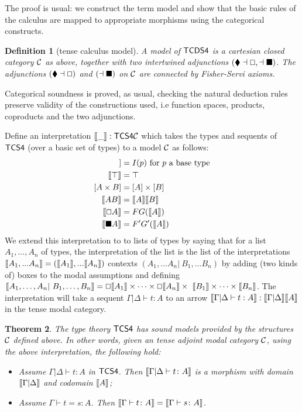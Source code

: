 \documentclass{article}
\let\Diamond\relax
\newcommand{\bLozenge}{\mathbin{\blacklozenge}}
\let\to\relax
\newcommand{\to}{\rightarrow}
\renewcommand{\Box}{\oblong}
\def\sem#1{[\hspace{-0.05cm}[#1]\hspace{-0.05cm}]}
\newtheorem{theorem}{Theorem}
\newtheorem{definition}[theorem]{Definition}
\begin{document}
The proof is usual: we construct the term model and show that the basic rules of the calculus are mapped to 
appropriate morphisms using  the categorical constructs. 
\fi 

\begin{definition}[tense calculus model]
A model of $\sf{TCDS4}$ is a cartesian closed category $\cal{C}$ as above, together with two intertwined adjunctions $(\bLozenge\dashv \Box, \Diamond\dashv \blacksquare)$.  The adjunctions $(\bLozenge\dashv \Box)$ and $(\Diamond\dashv \blacksquare)$ on $\cal{C}$ are connected by Fisher-Servi axioms. 
\end{definition}

Categorical soundness is proved, as usual, checking the natural deduction rules preserve validity of the constructions used, i.e function spaces, products, coproducts and the two adjunctions. 

Define an interpretation $\sem{\_} : \sf{TCS4} \to {\cal C}$ which takes the types and sequents of $\sf{TCS4}$ (over a basic 
set of types)  to a model $\cal C$ as follows:
\begin{align*}
\sem{p} &= I(p) \mbox{  for $p$ a base type}\\
\sem{\top} &= \top\\
[A\times B] &= [A]\times [B]\\
\sem{  A \to B  } &=  \sem{ A}  \to  \sem{ B }\\
\sem{\Box A} &= F G(\sem{A})\\
\sem{\blacksquare A} &= F' G'(\sem{A})
\end{align*}
 We extend this interpretation to 
 to lists of types by saying that for a list $A_1, ..., A_n$ of types,
 the interpretation of the list is the list of the interpretations
 $\sem{A_1,...A_n} = (\sem{A_1}, . . . \sem{A_n})$ 
contexts $(A_1,...A_n | \ B_1,...B_n)$ by adding (two kinds of) boxes to the modal
assumptions and defining
$ \sem{A_1,\ldots, A_n |\  B_1,\ldots,B_n} = 
\Box \sem{A_1}\times \cdots \times \Box \sem{A_n} \times
\  \sem{B_1}\times \cdots \times\sem{B_n} $.
The interpretation will take a sequent $\Gamma|\Delta \vdash t : A$ to an arrow 
$ \sem {\Gamma|\Delta \vdash t : A} : \sem{ \Gamma|\Delta} \to \sem{A} $
in the tense modal category.


\begin{theorem}
\label{thm:tcs4-csound}
The type theory $\sf{TCS4}$  has  \textit{sound} models provided by the structures $\cal C$ defined above.
In other words, given an tense adjoint modal category $\cal C$, using the above interpretation, the following hold:
\begin{itemize}
\item Assume $\Gamma|\Delta \vdash t : A$ in $\sf{TCS4}$. Then $\sem{\Gamma |
    \Delta \vdash t \colon A}$ is a morphism  with domain
  $\sem{\Gamma | \Delta}$ and codomain $\sem{A}$;
\item Assume $\Gamma \vdash t = s \colon A$. Then $\sem{\Gamma
  \vdash t \colon A} = \sem{\Gamma \vdash s \colon A}$.
\end{itemize}
\end{theorem}
\end{document}
